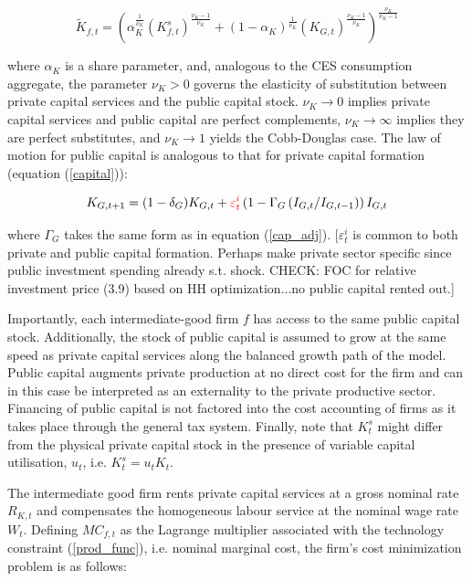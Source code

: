 \documentclass[a4paper,11pt]{article}
\numberwithin{equation}{section}
\begin{document}
	\begin{equation} \label{cap_stock}
	\tilde{K}_{f,t}=\left(\alpha_K^{\frac{1}{\nu_K}}\left(K_{f,t}^s\right)^{\frac{\nu_K-1}{\nu_K}}+\left(1-\alpha_K\right)^{\frac{1}{\nu_K}}\left(K_{G,t}\right)^{\frac{\nu_K-1}{\nu_K}}\right)^{\frac{\nu_K}{\nu_K-1}}
	\end{equation}
	
	where $\alpha_K$ is a share parameter, and, analogous to the CES consumption aggregate, the parameter $\nu_K>0$ governs the elasticity of substitution between private capital services and the public capital stock. $\nu_K\rightarrow0$ implies private capital services and public capital are perfect complements, $\nu_K\rightarrow\infty$ implies they are perfect substitutes, and $\nu_K\rightarrow1$ yields the Cobb-Douglas case. The law of motion for public capital is analogous to that for private capital formation (equation (\ref{capital})):
	
	\begin{equation} \label{capital_g}
	K_{G,t+1}=(1-\delta_G)K_{G,t}+{
\color{red}\varepsilon_t^i}\left(1-\Gamma_G\left(I_{G,t}/I_{G,t-1}\right)\right)I_{G,t}
	\end{equation}
	
	where $\Gamma_G$ takes the same form as in equation (\ref{cap_adj}). {
\color{red}[$\varepsilon_t^i$ is common to both private and public capital formation. Perhaps make private sector specific since public investment spending already s.t. shock. CHECK: FOC for relative investment price (3.9) based on HH optimization...no public capital rented out.]}
	
	Importantly, each intermediate-good firm $f$ has access to the same public capital stock. Additionally, the stock of public capital is assumed to grow at the same speed as private capital services along the balanced growth path of the model. Public capital augments private production at no direct cost for the firm and can in this case be interpreted as an externality to the private productive sector. Financing of public capital is not factored into the cost accounting of firms as it takes place through the general tax system. Finally, note that $K_t^s$ might differ from the physical private capital stock in the presence of variable capital utilisation, $u_t $, i.e. $K^s_t=u_t K_t$. 
	
	The intermediate good firm rents private capital services at a gross nominal rate $R_{K,t}$ and compensates the homogeneous labour service at the nominal wage rate $W_t$. Defining $MC_{f,t}$ as the Lagrange multiplier associated with the technology constraint (\ref{prod_func}), i.e. nominal marginal cost, the firm's cost minimization problem is as follows:
	
\end{document}
